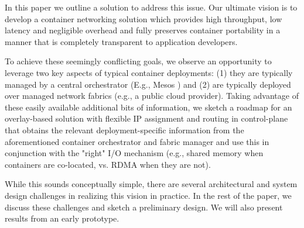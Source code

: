 In this paper we outline a solution to address this issue.  Our ultimate vision
is to develop a container networking solution which provides high throughput,
low latency and negligible overhead and fully preserves container portability in
a manner that is completely transparent to application developers. 

To achieve these seemingly conflicting goals, we observe an opportunity to
leverage two key aspects of typical container deployments: (1) they are
typically managed by a central orchestrator (E.g., Mesos ) and (2) are typically
deployed over managed network fabrics (e.g., a public cloud provider). Taking
advantage of these easily available additional bits of information, we sketch a
roadmap for an overlay-based solution  with flexible IP assignment and routing
in control-plane  that obtains the relevant
deployment-specific information from the aforementioned container orchestrator
and fabric manager and use this in conjunction with the "right" I/O mechanism
(e.g., shared memory when containers are co-located, vs. RDMA when they are
not). 

While this sounds conceptually simple, there are several architectural
and system design challenges in realizing this vision in practice. In the rest
of the paper, we discuss these challenges and sketch a preliminary design. We
will also present results from an early prototype.
